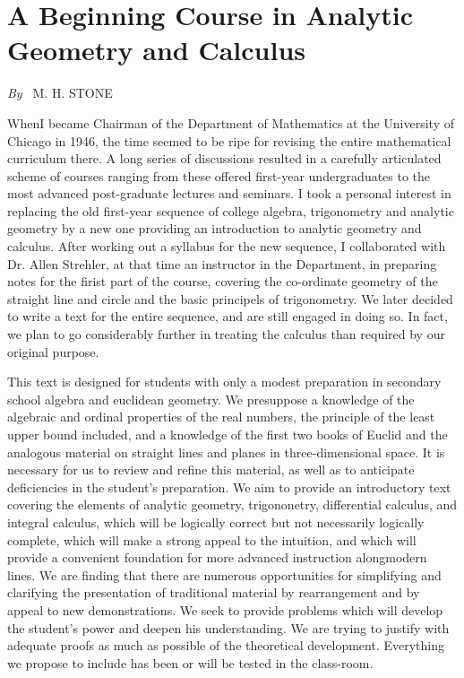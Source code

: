 
\chapter{A Beginning Course in Analytic Geometry and Calculus}


\begin{center}
{\em By~} M. H. STONE
\end{center}

When\pageoriginale  I became Chairman of the Department of Mathematics
at the University of Chicago in 1946, the time seemed to be ripe for
revising the entire mathematical curriculum there. A long series of
discussions resulted in a carefully articulated scheme of courses
ranging from these offered first-year undergraduates to the most
advanced post-graduate lectures and seminars. I took a personal
interest in replacing the old first-year sequence of college algebra,
trigonometry and analytic geometry by a new one providing an
introduction to analytic geometry and calculus. After working out a
syllabus for the new sequence, I collaborated with Dr. Allen Strehler,
at that time an instructor in the Department, in preparing notes for
the firist part of the course, covering the co-ordinate geometry of
the straight line and circle and the basic principels of
trigonometry. We later decided to write a text for the entire
sequence, and are still engaged in doing so. In fact, we plan to go
considerably further in treating the calculus than required by our
original purpose.

This text is designed for students with only a modest preparation in
secondary school algebra and euclidean geometry. We presuppose a
knowledge of the algebraic and ordinal properties of the real numbers,
the principle of the least upper bound included, and a knowledge of
the first two books of Euclid and the analogous material on straight
lines and planes in three-dimensional space. It is necessary for us to
review and refine this material, as well as to anticipate deficiencies
in the student's preparation. We aim to provide an introductory text
covering the elements of analytic geometry, trigononetry, differential
calculus, and integral calculus, which will be logically correct but
not necessarily logically complete, which will make a strong appeal to
the intuition, and which will provide a convenient foundation for more
advanced instruction along\pageoriginale modern lines. We are finding
that there are numerous opportunities for simplifying and clarifying
the presentation of traditional material by rearrangement and by
appeal to new demonstrations. We seek to provide problems which will
develop the student's power and deepen his understanding. We are
trying to justify with adequate proofs as much as possible of the
theoretical development. Everything we propose to include has been or
will be tested in the class-room.

